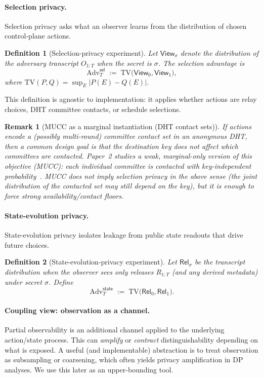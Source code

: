 \documentclass[11pt]{article}
\newtheorem{definition}{Definition}
\newtheorem{remark}{Remark}
\newcommand{\Adv}{\mathrm{Adv}}
\newcommand{\TV}{\mathrm{TV}}
\begin{document}
\paragraph{Selection privacy.}
Selection privacy asks what an observer learns from the distribution of chosen control-plane actions.

\begin{definition}[Selection-privacy experiment]
Let $\mathsf{View}_\sigma$ denote the distribution of the adversary transcript $O_{1:T}$ when the secret is $\sigma$.
The selection advantage is
\[
\Adv^{\mathsf{sel}}_T \;:=\; \TV\big(\mathsf{View}_0,\mathsf{View}_1\big),
\]
where $\TV(P,Q)=\sup_E |P(E)-Q(E)|$.
\end{definition}

This definition is agnostic to implementation: it applies whether actions are relay choices, DHT committee contacts, or schedule selections.

\begin{remark}[MUCC as a marginal instantiation (DHT contact sets)]
If actions encode a (possibly multi-round) committee contact set in an anonymous DHT, then a common design goal is that the destination key does not affect which committees are contacted.
Paper~2 studies a weak, marginal-only version of this objective (MUCC): each individual committee is contacted with key-independent probability~\cite{series:state2}.
MUCC does \emph{not} imply selection privacy in the above sense (the joint distribution of the contacted set may still depend on the key), but it is enough to force strong availability/contact floors.
\end{remark}

\paragraph{State-evolution privacy.}
State-evolution privacy isolates leakage from public state readouts that drive future choices.

\begin{definition}[State-evolution-privacy experiment]
Let $\mathsf{Rel}_\sigma$ be the transcript distribution when the observer sees only releases $R_{1:T}$ (and any derived metadata) under secret $\sigma$.
Define
\[
\Adv^{\mathsf{state}}_T \;:=\; \TV\big(\mathsf{Rel}_0,\mathsf{Rel}_1\big).
\]
\end{definition}

\paragraph{Coupling view: observation as a channel.}
Partial observability is an additional channel applied to the underlying action/state process.
This can \emph{amplify} or \emph{contract} distinguishability depending on what is exposed.
A useful (and implementable) abstraction is to treat observation as subsampling or coarsening, which often yields privacy amplification in DP analyses.
We use this later as an upper-bounding tool.
\end{document}
